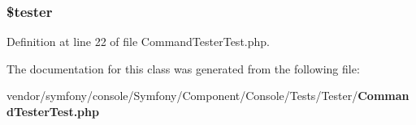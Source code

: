 \subsubsection[{\$tester}]{\setlength{\rightskip}{0pt plus 5cm}\$tester\hspace{0.3cm}{\ttfamily [protected]}}\label{class_symfony_1_1_component_1_1_console_1_1_tests_1_1_tester_1_1_command_tester_test_ab0233113403962d42d12af9dfd317d91}


Definition at line 22 of file Command\+Tester\+Test.\+php.



The documentation for this class was generated from the following file\+:\begin{DoxyCompactItemize}
\item 
vendor/symfony/console/\+Symfony/\+Component/\+Console/\+Tests/\+Tester/{\bf Command\+Tester\+Test.\+php}\end{DoxyCompactItemize}
